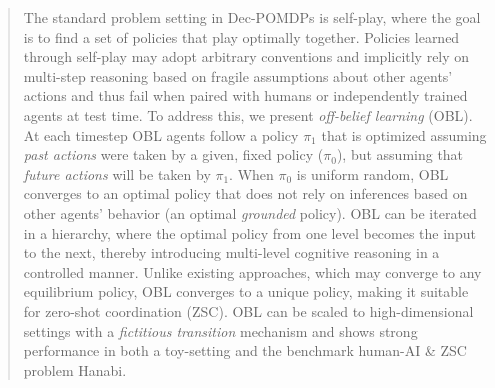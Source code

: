 \begin{abstract}
The standard problem setting in Dec-POMDPs is self-play, where the goal is to find a set of policies that play optimally together. Policies learned through self-play may adopt arbitrary conventions and implicitly rely on multi-step reasoning based on fragile assumptions about other agents' actions and thus fail when paired with humans or independently trained agents at test time.
To address this, we present \emph{off-belief learning} (OBL). At each timestep OBL agents follow a policy $\pi_1$ that is optimized assuming \emph{past actions} were taken by a given, fixed policy ($\pi_0$), but assuming that \emph{future actions} will be taken by $\pi_1$. When $\pi_0$ is uniform random, OBL converges to an optimal policy that does not rely on inferences based on other agents' behavior (an optimal \emph{grounded} policy).
OBL can be iterated in a hierarchy, where the optimal policy from one level becomes the input to the next, thereby introducing multi-level cognitive reasoning in a controlled manner. Unlike existing approaches, which may converge to any equilibrium policy, OBL converges to a unique policy, making it suitable for zero-shot coordination (ZSC).
OBL can be scaled to high-dimensional settings with a \emph{fictitious transition} mechanism and shows strong performance in both a toy-setting and the benchmark human-AI \& ZSC problem Hanabi.
\end{abstract}
